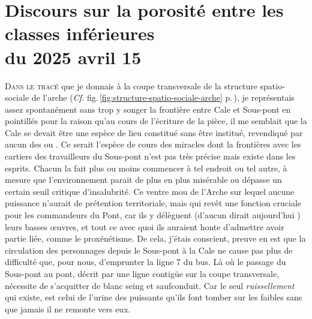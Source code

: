 \chapter[Discours sur la porosité entre les classes inférieures]{Discours sur la porosité entre les classes inférieures\\du 2025 avril 15}

\lettrine[lines=3]%
{D}{ans le tracé} que je donnais à la coupe transversale de la structure spatio-sociale de l’arche (\emph{Cf.} fig.\,\ref{fig:structure-spatio-sociale-arche} p.\,\pageref{fig:structure-spatio-sociale-arche}), je représentais assez spontanément sans trop y songer la frontière entre Cale et Sous-pont en pointillés pour la raison qu’au cours de l’écriture de la pièce, il me semblait que la Cale se devait être une espèce de lieu constitué sans être institué, revendiqué par aucun des \campprincipal{} ou \campoppose{}. Ce serait l’espèce de cours des miracles dont la frontières avec les cartiers des travailleurs du Sous-pont  n’est pas très précise mais existe dans les esprits. Chacun la fait plus ou moins commencer à tel endroit ou tel autre, à mesure que l’environnement parait de plus en plus misérable ou dépasse un certain seuil critique d’insalubrité. Ce ventre mou de l’Arche sur lequel aucune puissance n’aurait de prétention territoriale, mais qui revêt une fonction cruciale pour les commandeurs du Pont, car ils y délèguent (d’aucun dirait aujourd’hui ) leurs basses œuvres, et tout ce avec quoi ils auraient honte d’admettre avoir partie liée, comme le proxénétisme. De cela, j’étais conscient, preuve en est que la circulation des personnages depuis le Sous-pont à la Cale ne cause pas plus de difficulté que, pour nous, d’emprunter la ligne 7 du bus. Là où le passage du Sous-pont au pont, décrit par une ligne contigüe sur la coupe transversale, nécessite de s’acquitter de blanc seing et saufconduit. Car le seul \emph{ruissellement} qui existe, est celui de l’urine des puissants qu’ils font tomber sur les faibles sans que jamais il ne remonte vers eux.

